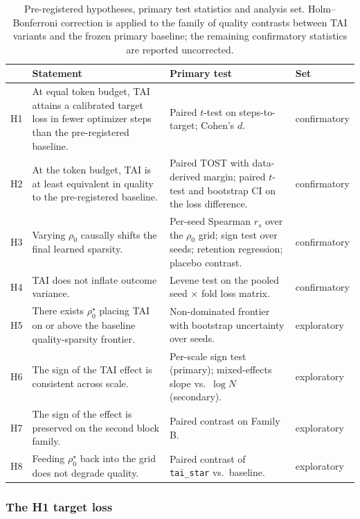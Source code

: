 \documentclass[final,5p,times,twocolumn]{elsarticle}
\theoremstyle{remark}
\newcommand{\rhoz}{\rho_{0}}
\begin{document}
\begin{table}[t]
\centering
\small
\caption{Pre-registered hypotheses, primary test statistics and analysis set.
Holm--Bonferroni correction is applied to the family of quality contrasts
between TAI variants and the frozen primary baseline; the remaining
confirmatory statistics are reported uncorrected.}
\label{tab:hypotheses}
\begin{tabular}{@{}p{0.6cm}p{5.0cm}p{3.9cm}p{2.7cm}@{}}
\toprule
& Statement & Primary test & Set \\
\midrule
H1 & At equal token budget, TAI attains a calibrated target loss in fewer
optimizer steps than the pre-registered baseline. &
Paired $t$-test on steps-to-target; Cohen's $d$. & confirmatory \\
\addlinespace
H2 & At the token budget, TAI is at least equivalent in quality to the
pre-registered baseline. &
Paired TOST with data-derived margin; paired $t$-test and bootstrap CI on the
loss difference. & confirmatory \\
\addlinespace
H3 & Varying $\rhoz$ causally shifts the final learned sparsity. &
Per-seed Spearman $r_{s}$ over the $\rhoz$ grid; sign test over seeds;
retention regression; placebo contrast. & confirmatory \\
\addlinespace
H4 & TAI does not inflate outcome variance. &
Levene test on the pooled seed $\times$ fold loss matrix. & confirmatory \\
\addlinespace
H5 & There exists $\rhoz^{\star}$ placing TAI on or above the baseline
quality-sparsity frontier. &
Non-dominated frontier with bootstrap uncertainty over seeds. & exploratory \\
\addlinespace
H6 & The sign of the TAI effect is consistent across scale. &
Per-scale sign test (primary); mixed-effects slope vs.\ $\log N$ (secondary). &
exploratory \\
\addlinespace
H7 & The sign of the effect is preserved on the second block family. &
Paired contrast on Family B. & exploratory \\
\addlinespace
H8 & Feeding $\rhoz^{\star}$ back into the grid does not degrade quality. &
Paired contrast of \texttt{tai\_star} vs.\ baseline. & exploratory \\
\bottomrule
\end{tabular}
\end{table}

\subsubsection{The H1 target loss}
\end{document}
